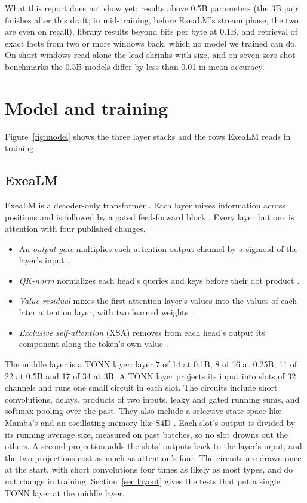 \documentclass[10pt,twocolumn,letterpaper]{article}
\begin{document}
What this report does not show yet: results above 0.5B parameters (the 3B pair finishes after this draft; in mid-training, before ExeaLM's stream phase, the two are even on recall), library results beyond bits per byte at 0.1B, and retrieval of exact facts from two or more windows back, which no model we trained can do.
On short windows read alone the lead shrinks with size, and on seven zero-shot benchmarks the 0.5B models differ by less than 0.01 in mean accuracy.

\section{Model and training}
\label{sec:model}

Figure~\ref{fig:model} shows the three layer stacks and the rows ExeaLM reads in training.

\subsection{ExeaLM}

ExeaLM is a decoder-only transformer \citep{vaswani2017attention}.
Each layer mixes information across positions and is followed by a gated feed-forward block \citep{shazeer2020glu}.
Every layer but one is attention with four published changes.
\begin{itemize}
\item An \emph{output gate} multiplies each attention output channel by a sigmoid of the layer's input \citep{qiu2025gated}.
\item \emph{QK-norm} normalizes each head's queries and keys before their dot product \citep{henry2020qknorm}.
\item \emph{Value residual} mixes the first attention layer's values into the values of each later attention layer, with two learned weights \citep{zhou2024value}.
\item \emph{Exclusive self-attention} (XSA) removes from each head's output its component along the token's own value \citep{zhai2026xsa}.
\end{itemize}

The middle layer is a TONN layer: layer 7 of 14 at 0.1B, 8 of 16 at 0.25B, 11 of 22 at 0.5B and 17 of 34 at 3B.
A TONN layer projects its input into slots of 32 channels and runs one small circuit in each slot.
The circuits include short convolutions, delays, products of two inputs, leaky and gated running sums, and softmax pooling over the past.
They also include a selective state space like Mamba's \citep{gu2023mamba} and an oscillating memory like S4D \citep{gu2022s4d}.
Each slot's output is divided by its running average size, measured on past batches, so no slot drowns out the others.
A second projection adds the slots' outputs back to the layer's input, and the two projections cost as much as attention's four.
The circuits are drawn once at the start, with short convolutions four times as likely as most types, and do not change in training.
Section~\ref{sec:layout} gives the tests that put a single TONN layer at the middle layer.
\end{document}
